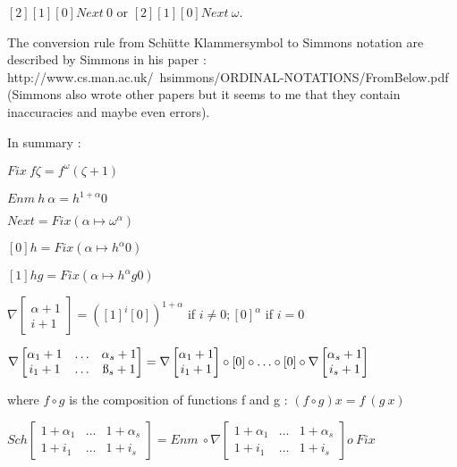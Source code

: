 \documentclass[10pt]{article}
\begin{document}
\( [2] [1] [0] Next\ 0 \) or \( [2] [1] [0] Next\ \omega \). 

The conversion rule from Schütte Klammersymbol to Simmons notation are described by Simmons in his paper : http://www.cs.man.ac.uk/~hsimmons/ORDINAL-NOTATIONS/FromBelow.pdf (Simmons also wrote other papers but it seems to me that they contain inaccuracies and maybe even errors).

In summary :

\( Fix\ f \zeta = f^\omega (\zeta+1) \)

\( Enm\ h\ \alpha = h^{1+\alpha} 0 \)

\( Next = Fix (\alpha \mapsto \omega^\alpha) \)

\( [0] h = Fix (\alpha \mapsto h^\alpha 0) \)

\( [1] h g = Fix (\alpha \mapsto h^\alpha g 0) \)

\( \nabla \begin{bmatrix} \alpha+1 \\
                                    i+1      \end{bmatrix} =
 ([1]^i [0])^{1+\alpha} \) if \( i \neq 0 ; [0]^\alpha \) if \( i = 0 \)

\( \nabla \begin{bmatrix} \alpha_1+1 & \ldots & \alpha_s+1 \\
                                    i_1+1      & \ldots & \i_s+1     \end{bmatrix} 
= \nabla \begin{bmatrix} \alpha_1+1 \\
                                   i_1+1      \end{bmatrix} \circ [0] \circ \ldots \circ [0] \circ \nabla \begin{bmatrix} \alpha_s+1 \\
                                                                                                                    i_s+1      \end{bmatrix}
\)

where \( f \circ g \) is the composition of functions f and g : \( (f \circ g) x = f\ (g\ x) \)

\( Sch \begin{bmatrix} 1+\alpha_1 & \ldots & 1+\alpha_s \\
                       1+i_1      & \ldots & 1+i_s      \end{bmatrix} 
= Enm\ \circ \nabla \begin{bmatrix} 1+\alpha_1 & \ldots & 1+\alpha_s \\
                                          1+i_1      & \ldots & 1+i_s      \end{bmatrix} o\ Fix
\)
\end{document}
